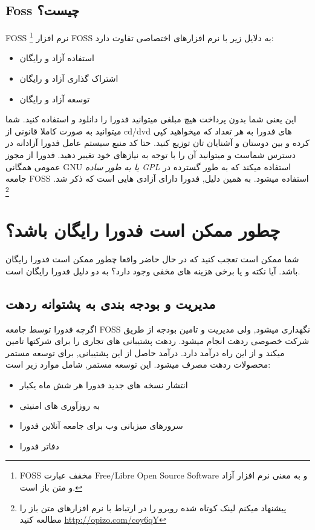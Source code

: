 \subsection{Foss چیست؟}\label{se-116}
FOSS
\footnote{FOSS مخفف عبارت Free/Libre Open Source Software و به معنی نرم افزار آزاد و متن باز است.}
نرم افزار FOSS به دلایل زیر با نرم افزارهای اختصاصی تفاوت دارد:
\begin{itemize}
	\item استفاده آزاد و رایگان
	\item اشتراک گذاری آزاد و رایگان
	\item توسعه آزاد و رایگان
\end{itemize}
این یعنی شما بدون پرداخت هیچ مبلغی میتوانید فدورا را دانلود و استفاده کنید. شما میتوانید به صورت کاملا قانونی از cd/dvd های فدورا به هر تعداد که میخواهید کپی کرده و بین دوستان و آشنایان تان توزیع کنید. حتا کد منبع سیستم عامل فدورا آزادانه در دسترس شماست و میتوانید آن را با توجه به نیازهای خود تغییر دهید.
فدورا از مجوز عمومی همگانی GNU 
\emph{یا به طور ساده GPL}
  استفاده میکند که به طور گسترده در جامعه FOSS استفاده میشود. به همین دلیل, فدورا دارای آزادی هایی است که ذکر شد.
\footnote{پیشنهاد میکنم لینک کوتاه شده روبرو را در ارتباط با نرم افزارهای متن باز را مطالعه کنید
\href{http://www.linuxfedora.ir/viewtopic.php?f=47&t=133}{http://opizo.com/coy6qY}
}
\section{چطور ممکن است فدورا رایگان باشد؟}\label{se-117}
شما ممکن است تعجب کنید که در حال حاضر واقعا چطور ممکن است فدورا رایگان باشد. آیا نکته و یا برخی هزینه های مخفی وجود دارد؟ به دو دلیل فدورا رایگان است.
\subsection{مدیریت و بودجه بندی به پشتوانه ردهت}\label{se-1171}
اگرچه فدورا توسط جامعه FOSS نگهداری میشود, ولی مدیریت و تامین بودجه از طریق شرکت خصوصی ردهت انجام میشود.
ردهت پشتیبانی های تجاری را برای شرکتها تامین میکند و از این راه درآمد دارد. درآمد حاصل از این پشتیبانی, برای توسعه مستمر محصولات ردهت مصرف میشود. این توسعه مستمر, شامل موارد زیر است:
\begin{itemize}
	\item انتشار نسخه های جدید فدورا هر شش ماه یکبار
	\item به روزآوری های امنیتی
	\item سرورهای میزبانی وب برای جامعه آنلاین فدورا
	\item دفاتر فدورا
\end{itemize}
